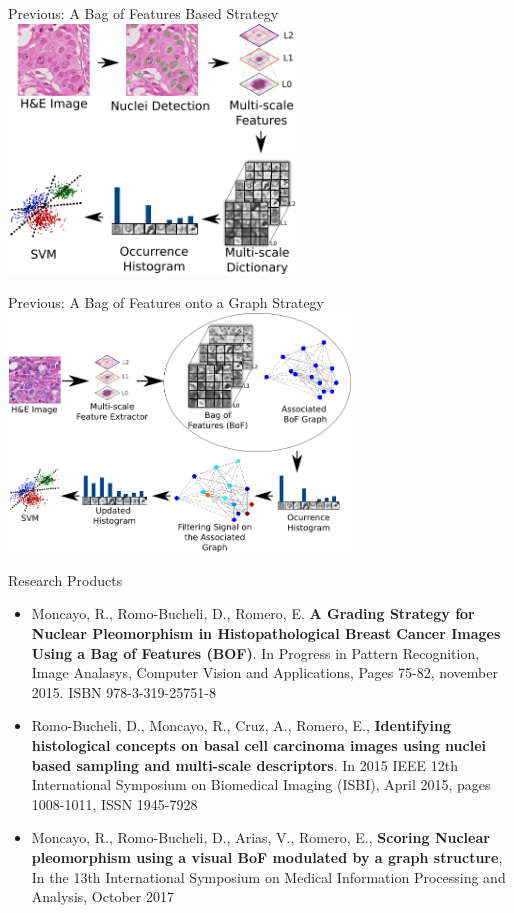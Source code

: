 \documentclass[usenames,dvipsnames]{beamer}
\begin{document}
\begin{frame}{Previous: A Bag of Features Based Strategy }
\centering\includegraphics[width=0.57\textwidth]{imagenes/metodo_sustentacion.png}
\end{frame}
\begin{frame}{Previous: A Bag of Features onto a Graph Strategy}
\centering\includegraphics[width=0.68\textwidth]{imagenes/metodo_sipaim2017.png}
\end{frame}

\begin{frame}{Research Products }

\small
\begin{itemize}
\item Moncayo, R., Romo-Bucheli, D., Romero, E. \textbf{A Grading Strategy for Nuclear Pleomorphism in Histopathological Breast Cancer Images Using a Bag of Features (BOF)}. In Progress in Pattern Recognition, Image Analasys, Computer Vision and Applications, Pages 75-82, november 2015. ISBN 978-3-319-25751-8
\item Romo-Bucheli, D., Moncayo, R., Cruz, A., Romero, E., \textbf{Identifying histological concepts on basal cell carcinoma images using nuclei based sampling and multi-scale descriptors}. In 2015 IEEE 12th International Symposium on Biomedical Imaging (ISBI), April 2015, pages 1008-1011, ISSN 1945-7928
\item Moncayo, R., Romo-Bucheli, D., Arias, V., Romero, E., \textbf{Scoring Nuclear pleomorphism using a visual BoF modulated by a graph structure}, In the 13th International Symposium on Medical Information Processing and Analysis, October 2017
\end{itemize}


\end{frame}
\end{document}
